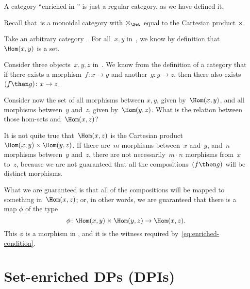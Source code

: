 \begin{example}
    A category ``enriched in \Set'' is just a regular category, as we have defined it.

    Recall that~\Set is a monoidal category with $\otimes_{\Set}$ equal to the Cartesian product $\times$.

    Take an arbitrary category~\CatC. For all~$x, y$ in~\CatC, we know by definition
    that~$\Hom(x,y)$ is a set.

    Consider three objects~$x,y,z$ in~\CatC. We know from the definition of a
    category that if there exists a morphism~$f: x \to y$ and another~$g: y \to z$,
    then there also exists~$(f\then g)\colon x \to z$.

    Consider now the set of all morphisms between $x, y$, given by~$\Hom(x,y)$, and
    all morphisms between~$y$ and~$z$, given by~$\Hom(y, z)$. What is the relation
    between those hom-sets and~$\Hom(x, z)$?

    It is not quite true that~$\Hom(x, z)$ is the Cartesian product~$\Hom(x, y)
    \times \Hom(y, z)$. If there are~$m$ morphisms between~$x$ and~$y$, and~$n$
    morphisms between~$y$ and~$z$, there are not necessarily~$m \cdot n$ morphisms
    from~$x$ to~$z$, because we are not guaranteed that all the compositions~$(f\then g)$
    will be distinct morphisms.

    What we are guaranteed is that all of the compositions will be mapped to something in~$\Hom(x, z)$; or, in other words, we are guaranteed that there
    is a map $\phi$ of the type
    \begin{equation*}
        \phi \colon \Hom(x, y) \times \Hom(y, z) \rightarrow \Hom(x, z).
    \end{equation*}
    This $\phi$ is a morphism in \Set, and it is the witness required by~\cref{eq:enriched-condition}.

\end{example}


\section{Set-enriched DPs (DPIs)}

